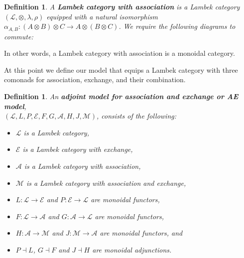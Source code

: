 \documentclass{article}
\newtheorem{definition}[theorem]{Definition}
\let\mto\to
\let\to\relax
\newcommand{\to}{\rightarrow}
\newcommand{\cat}[1]{\mathcal{#1}}
\newcommand{\id}[0]{\mathsf{id}}
\begin{document}
\begin{definition}
  \label{def:exchange}
  A \textbf{Lambek category with association} is a Lambek category
  $(\cat{L}, \otimes, \lambda, \rho)$ equipped with a natural
  isomorphism $\alpha_{A,B}: (A \otimes B) \otimes C \mto A \otimes
  (B \otimes C)$.  We require the following diagrams to commute:
\end{definition}
\noindent
In other words, a Lambek category with association is a monoidal
category.

At this point we define our model that equips a Lambek category with
three comonads for association, exchange, and their combination.
\begin{definition}
  \label{def:adjoint-model}
  An \textbf{adjoint model for association and exchange or AE model}, \\
  $(\cat{L},L,P,\cat{E},F,G,\cat{A},H,J,\cat{M})$, consists of the following:
  \begin{itemize}
  \item $\cat{L}$ is a Lambek category,
  \item $\cat{E}$ is a Lambek category with exchange,
  \item $\cat{A}$ is a Lambek category with association,    
  \item $\cat{M}$ is a Lambek category with association and exchange,
  \item $L : \cat{L} \mto \cat{E}$ and $P : \cat{E} \mto \cat{L}$ are monoidal functors,
  \item $F : \cat{L} \mto \cat{A}$ and $G : \cat{A} \mto \cat{L}$ are monoidal functors,
  \item $H : \cat{A} \mto \cat{M}$ and $J : \cat{M} \mto \cat{A}$ are monoidal functors, and
  \item $P \dashv L$, $G \dashv F$ and $J \dashv H$ are monoidal adjunctions.
  \end{itemize}
\end{definition}
\end{document}
